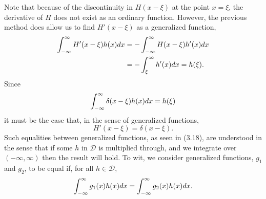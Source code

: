 Note that because of the discontinuity in \(H(x-\xi)\) at the point \(x=\xi\), the derivative of \(H\) does not exist as an ordinary function. However, the previous method does allow us to find \(H'(x-\xi)\) as a generalized function, 
\begin{equation}
    \begin{split}
        \int_{-\infty}^{\infty} H'(x-\xi)h(x)dx &= -\int_{-\infty}^{\infty} H(x-\xi)h'(x)dx\\
        &=-\int_{\xi}^{\infty}h'(x)dx = h(\xi).
    \end{split}
\end{equation}
Since
\begin{equation}
    \int_{-\infty}^{\infty} \delta(x-\xi)h(x)dx=h(\xi)
\end{equation}
it must be the case that, in the sense of generalized functions,
\begin{equation}
    H'(x-\xi) = \delta(x-\xi).
\end{equation}
Such equalities between generalized functions, as seen in (3.18), are understood in the sense that if some \(h\) in \(\mathcal{D}\) is multiplied through, and we integrate over \((-\infty, \infty)\) then the result will hold. To wit, we consider generalized functions, \(g_1\) and \(g_2\), to be equal if, for all \(h\in \mathcal{D}\),
\begin{equation}
    \int_{-\infty}^{\infty} g_1(x)h(x)dx = \int_{-\infty}^{\infty} g_2(x)h(x)dx.
\end{equation}

